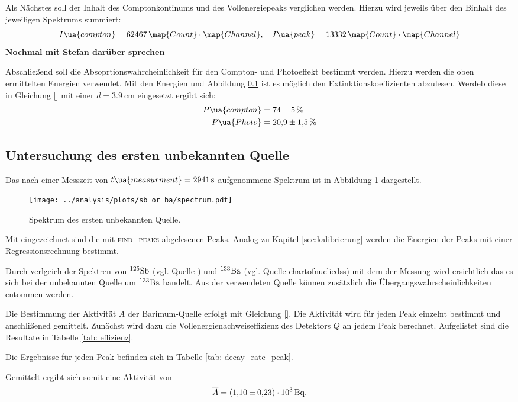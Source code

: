 Als Nächstes soll der Inhalt des Comptonkontinums und des Vollenergiepeaks
verglichen werden. Hierzu wird jeweils über den Binhalt des jeweiligen Spektrums
summiert:
\begin{equation}
  \label{eq:flacehe}
  I\ua{compton} = 62467 \, \map{Count}\cdot\map{Channel}, \quad I\ua{peak}=13332\, \map{Count}\cdot\map{Channel}
\end{equation}
\textbf{Nochmal mit Stefan darüber sprechen}

Abschließend soll die Absoprtionswahrcheinlichkeit für den
Compton- und Photoeffekt bestimmt werden. Hierzu werden die
oben ermittelten Energien verwendet. Mit den Energien und Abbildung
\ref{} ist es möglich den Extinktionskoeffizienten abzulesen.
Werdeb diese in Gleichung \eqref{} mit einer $d=\SI{3.9}{\centi\meter}$ eingesetzt ergibt sich:
\begin{align}
  \label{eq:absorptioswahrscheinlichkeit}
  \begin{aligned}
    P\ua{compton}&= \num{74\pm5}\,\% \\
    P\ua{Photo}&= \num{20.9\pm1.5}\, \%
  \end{aligned}
\end{align}

\subsection{Untersuchung des ersten unbekannten Quelle}
Das nach einer Messzeit von $t\ua{measurment}=\SI{2941}{\second}$ aufgenommene
Spektrum ist in Abbildung \ref{fig:spektrum_sb_or_ba} dargestellt.
\begin{figure}
  \centering
  \texttt{[image: ../analysis/plots/sb\_or\_ba/spectrum.pdf]}
  \caption{Spektrum des ersten unbekannten Quelle.}
  \label{fig:spektrum_sb_or_ba}
\end{figure}
Mit eingezeichnet sind die mit \textsc{find\_peaks} abgelesenen Peaks.
Analog zu Kapitel \ref{sec:kalibrierung} werden die Energien der Peaks mit
einer Regressionsrechnung bestimmt.

Durch verlgeich der Spektren von $^{125}\ce{Sb}$ (vgl. Quelle \cite{chartofnuclieds})
und $^{133}\ce{Ba}$ (vgl. Quelle chartofnucliedss) mit dem
der Messung wird ersichtlich das es sich bei der unbekannten Quelle um $^{133}\ce{Ba}$
handelt. Aus der verwendeten Quelle können zusätzlich die Übergangswahrscheinlichkeiten
entommen werden.

Die Bestimmung der Aktivität $A$ der Barimum-Quelle erfolgt mit Gleichung \eqref{}.
Die Aktivität wird für jeden Peak einzelnt bestimmt und anschlißened
gemittelt. Zunächst wird dazu die Vollenergienachweiseffizienz des Detektors $Q$ an jedem
Peak berechnet. Aufgelistet sind die Resultate in Tabelle \ref{tab: effizienz}.

Die Ergebnisse für jeden Peak befinden sich in Tabelle \ref{tab: decay_rate_peak}.

Gemittelt ergibt sich somit eine Aktivität von
\begin{equation}
  \label{eq:aktivität_Ba}
  \overline{A}=\SI{1.10\pm0.23 e3}{\becquerel}.
\end{equation}
